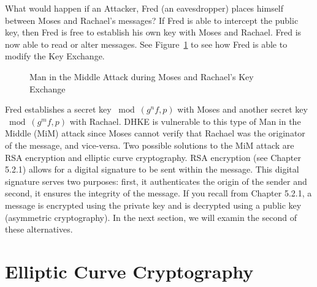 What would happen if an Attacker, Fred (an eavesdropper) places himself between Moses and Rachael's messages?  If Fred is able to intercept the public key, then Fred is free to establish his own key with Moses and Rachael.  Fred is now able to read or alter messages.  See Figure~\ref{fig:DH:DHKE_2} to see how Fred is able to modify the Key Exchange.
\begin{figure}[H]
	  \caption{\label{fig:DH:DHKE_2} Man in the Middle Attack during Moses and Rachael's Key Exchange }
\end{figure}

Fred establishes a secret key $\bmod ( g^nf, p)$ with Moses and another secret key $\bmod ( g^mf, p)$ with Rachael.  DHKE is vulnerable to this type of Man in the Middle (MiM) attack since Moses cannot verify that Rachael was the originator of the message, and vice-versa.  Two possible solutions to the MiM attack are RSA encryption and elliptic curve cryptography. RSA encryption (see Chapter 5.2.1) allows for a digital signature to be sent within the message. This digital signature serves two purposes: first, it authenticates the origin of the sender and second, it ensures the integrity of the message. If you recall from Chapter 5.2.1, a message is encrypted using the private key and is decrypted using a public key (asymmetric cryptography). In the next section, we will examin the second of these alternatives. 

\section{Elliptic Curve Cryptography}\label{sec:ECC:2}


